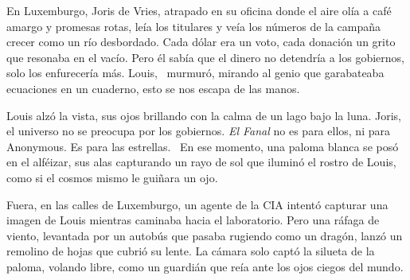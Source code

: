 En Luxemburgo, Joris de Vries, atrapado en su oficina donde el aire olía a café amargo y promesas rotas, leía los titulares y veía los números de la campaña crecer como un río desbordado. Cada dólar era un voto, cada donación un grito que resonaba en el vacío. Pero él sabía que el dinero no detendría a los gobiernos, solo los enfurecería más. \glqq Louis,\grqq~ murmuró, mirando al genio que garabateaba ecuaciones en un cuaderno, \glqq esto se nos escapa de las manos.\grqq

Louis alzó la vista, sus ojos brillando con la calma de un lago bajo la luna. \glqq Joris, el universo no se preocupa por los gobiernos. \emph{El Fanal} no es para ellos, ni para Anonymous. Es para las estrellas.\grqq~ En ese momento, una paloma blanca se posó en el alféizar, sus alas capturando un rayo de sol que iluminó el rostro de Louis, como si el cosmos mismo le guiñara un ojo.

Fuera, en las calles de Luxemburgo, un agente de la CIA intentó capturar una imagen de Louis mientras caminaba hacia el laboratorio. Pero una ráfaga de viento, levantada por un autobús que pasaba rugiendo como un dragón, lanzó un remolino de hojas que cubrió su lente. La cámara solo captó la silueta de la paloma, volando libre, como un guardián que reía ante los ojos ciegos del mundo.
